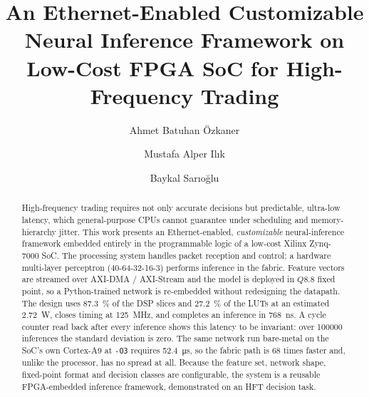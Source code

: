 \documentclass[final,5p,times,twocolumn]{elsarticle}
\begin{document}
\begin{frontmatter}

\title{
An Ethernet-Enabled Customizable Neural Inference Framework
on Low-Cost FPGA SoC for High-Frequency Trading
}

\author[bilgi]{Ahmet Batuhan \"Ozkaner}

\author[bilgi]{Mustafa Alper Il{\i}k}

\author[bilgi]{Baykal Sar{\i}o\u{g}lu}


\address[bilgi]{Department of Electrical and Electronics Engineering,
Istanbul Bilgi University, Istanbul, T\"urkiye}

\begin{abstract}
High-frequency trading requires not only accurate decisions but predictable,
ultra-low latency, which general-purpose CPUs cannot guarantee under scheduling
and memory-hierarchy jitter. This work presents an Ethernet-enabled,
\emph{customizable} neural-inference framework embedded entirely in the
programmable logic of a low-cost Xilinx Zynq-7000 SoC. The processing system
handles packet reception and control; a hardware multi-layer perceptron
(40-64-32-16-3) performs inference in the fabric. Feature vectors are streamed
over AXI-DMA / AXI-Stream and the model is deployed in $Q8.8$ fixed point, so a
Python-trained network is re-embedded without redesigning the datapath. The
design uses \SI{87.3}{\percent} of the DSP slices and \SI{27.2}{\percent} of the
LUTs at an estimated \SI{2.72}{\watt}, closes timing at \SI{125}{\mega\hertz},
and completes an inference in \SI{768}{\nano\second}. A cycle counter read back
after every inference shows this latency to be invariant: over \num{100000}
inferences the standard deviation is zero. The same network run bare-metal on
the SoC's own Cortex-A9 at \texttt{-O3} requires \SI{52.4}{\micro\second}, so
the fabric path is 68 times faster and, unlike the processor, has no spread at
all. Because the feature set, network shape, fixed-point format and decision
classes are configurable, the system is a reusable FPGA-embedded inference
framework, demonstrated on an HFT decision task.
\end{abstract}


\end{frontmatter}
\end{document}
